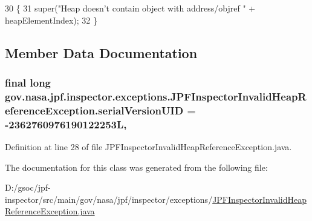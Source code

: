 \begin{DoxyCode}
30                                                                           \{
31     super(\textcolor{stringliteral}{"Heap doesn't contain object with address/objref "} + heapElementIndex);
32   \}
\end{DoxyCode}


\subsection{Member Data Documentation}
\subsubsection[{\texorpdfstring{serial\+Version\+U\+ID}{serialVersionUID}}]{\setlength{\rightskip}{0pt plus 5cm}final long gov.\+nasa.\+jpf.\+inspector.\+exceptions.\+J\+P\+F\+Inspector\+Invalid\+Heap\+Reference\+Exception.\+serial\+Version\+U\+ID = -\/2362760976190122253L\hspace{0.3cm}{\ttfamily [static]}, {\ttfamily [private]}}\hypertarget{classgov_1_1nasa_1_1jpf_1_1inspector_1_1exceptions_1_1_j_p_f_inspector_invalid_heap_reference_exception_a08fcd1f7bedf37373248664fd85b7e97}{}\label{classgov_1_1nasa_1_1jpf_1_1inspector_1_1exceptions_1_1_j_p_f_inspector_invalid_heap_reference_exception_a08fcd1f7bedf37373248664fd85b7e97}


Definition at line 28 of file J\+P\+F\+Inspector\+Invalid\+Heap\+Reference\+Exception.\+java.



The documentation for this class was generated from the following file\+:\begin{DoxyCompactItemize}
\item 
D\+:/gsoc/jpf-\/inspector/src/main/gov/nasa/jpf/inspector/exceptions/\hyperlink{_j_p_f_inspector_invalid_heap_reference_exception_8java}{J\+P\+F\+Inspector\+Invalid\+Heap\+Reference\+Exception.\+java}\end{DoxyCompactItemize}
